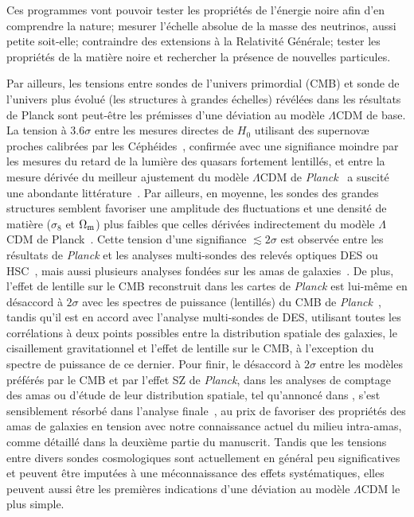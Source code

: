 Ces programmes vont pouvoir tester les propriétés de l'énergie
noire afin d'en comprendre la nature; mesurer l'échelle absolue de la
masse des neutrinos, aussi petite soit-elle; contraindre des
extensions à la Relativité Générale; tester les propriétés de la
matière noire et rechercher la présence de nouvelles particules.

Par ailleurs, les tensions entre sondes de l'univers primordial (CMB)
et sonde de l'univers plus évolué (les structures à grandes échelles)
révélées dans les résultats de Planck sont peut-être les prémisses
d'une déviation au modèle $\Lambda$CDM de base.
La tension à 3.6$\sigma$ entre les mesures directes de $H_{0}$ utilisant
des supernovæ proches calibrées par les
Céphéides~\citep[\emph{e.g.}][]{Riess2018}, confirmée avec une
signifiance moindre par les mesures du retard de la lumière des
quasars fortement lentillés, et entre la mesure dérivée du
meilleur ajustement du modèle $\Lambda$CDM
de \emph{Planck}~\citep{Planck_2018_cosmo} a suscité une abondante
littérature~\citep[voir par exemple][pour un
résumé]{Verde2019}. Par ailleurs, en moyenne, les sondes des grandes
structures semblent favoriser une amplitude des fluctuations et une
densité de matière ($\sigma_8$ et $\Omega_{\rm{m}}$) plus faibles que
celles dérivées indirectement du modèle $\Lambda$CDM de
Planck~\citep[voir][pour une revue]{Pratt2019}. Cette tension d'une
signifiance $\lesssim 2\sigma$ est observée entre les résultats de
\emph{Planck} et les analyses multi-sondes des relevés optiques DES ou
HSC~\citep[\emph{e.g.}][]{DES2019_cosmo},
mais aussi plusieurs analyses fondées sur les amas de
galaxies~\citep[\emph{e.g.}][]{Bocquet2019}.
De plus, l'effet de lentille sur le CMB reconstruit dans les cartes
de \emph{Planck} est lui-même en désaccord à $2\sigma$ avec les
spectres de puissance (lentillés) du CMB
de \emph{Planck}~\citep{Planck_2018_cosmo}, tandis qu'il est en accord 
avec l'analyse multi-sondes de DES, utilisant toutes les
corrélations à deux points possibles entre la distribution spatiale
des galaxies, le cisaillement gravitationnel et l'effet de lentille
sur le CMB, à l'exception du spectre de puissance de ce
dernier\citet{DES2019_cosmo}.
Pour finir, le désaccord à $2\sigma$ entre les modèles préférés par le
CMB et par l'effet SZ de \emph{Planck}, dans les analyses de comptage
des amas ou d'étude de leur distribution spatiale, tel
qu'annoncé dans \citet{Planck_2014_SZ_Cosmo, Planck_2014_ymap,
Planck_2016_SZ_cosmo, Planck2016_ymap}, s'est sensiblement résorbé
dans l'analyse finale~\citep{Planck_2018_cosmo, Zulbedia2019,
Salvati2018}, au prix de favoriser des propriétés des amas de galaxies
en tension avec notre connaissance actuel du milieu intra-amas, comme
détaillé dans la deuxième partie du manuscrit. Tandis que les tensions
entre divers sondes cosmologiques sont actuellement en général peu
significatives et peuvent être imputées à une méconnaissance des
effets systématiques, elles peuvent aussi être les premières
indications d'une déviation au modèle $\Lambda$CDM le plus simple.\\


